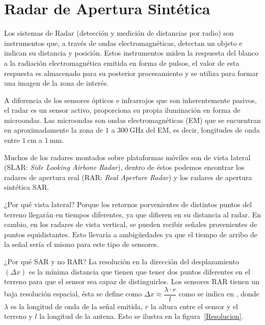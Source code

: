 
\chapter{Radar de Apertura Sintética}
\label{Radar}

Los sistemas de Radar (detección y medición de distancias por radio) son instrumentos que, a través de ondas electromagnéticas, detectan un objeto e indican su distancia y posición. 
Estos instrumentos miden la respuesta del blanco a la radiación electromagnética emitida en forma de pulsos, el valor de esta respuesta es almacenado para su posterior procesamiento y se utiliza para formar una imagen de la zona de interés. 

A diferencia de los sensores ópticos e infrarrojos que son inherentemente pasivos, el radar es un sensor activo, proporciona su propia iluminación en forma de microondas. Las microondas son ondas electromagnéticas (EM) que se encuentran en aproximadamente la zona de $1$ a $\SI{300}{\giga\hertz}$ del EM, es decir, longitudes de onda entre $\SI{1}{\centi\meter}$ a $\SI{1}{\milli\meter}$.

Muchos de los radares montados sobre plataformas móviles son de vista lateral (SLAR: \textit{Side Looking Airbone Radar}), dentro de éstos podemos encontrar los radares de apertura real (RAR: \textit{Real Aperture Radar}) y los radares de
apertura sintética SAR. 

¿Por qué vista lateral? Porque los retornos porvenientes de distintos puntos del terreno llegarán en tiempos diferentes, ya que difieren en su distancia al radar. En cambio, en los radares de vista vertical, se pueden recibir señales provenientes de puntos equidistantes. Esto llevaría a ambigüedades ya que el tiempo de arribo de la señal sería el mismo para este tipo de sensores.

¿Por qué SAR y no RAR? La resolución en la dirección del desplazamiento $(\Delta x)$ es la mínima distancia que tienen que tener dos puntos diferentes en el terreno para que el sensor sea capaz de distinguirlos. Los sensores RAR tienen un baja resolución espacial, ésta se define como  $\Delta x\approx\dfrac{\lambda \cdot r}{l}$ como se indica en \citet{Sarmap2009}, donde $\lambda$ es la longitud de onda  de la señal emitida, $r$ la altura entre el sensor y el terreno y $l$ la longitud de la antena. 
Esto se ilustra en la figura~\ref{Resolucion}.

